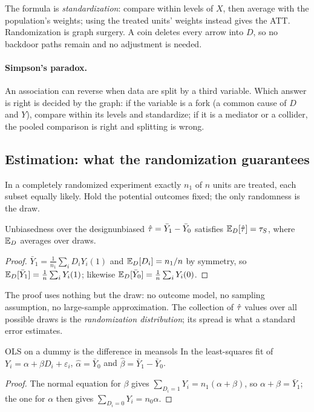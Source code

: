\documentclass[11pt]{article}
\begin{document}
The formula is \emph{standardization}: compare within levels of $X$, then average with the population's
weights; using the treated units' weights instead gives the ATT. Randomization is graph surgery. A coin
deletes every arrow into $D$, so no backdoor paths remain and no adjustment is needed.

\paragraph{Simpson's paradox.} An association can reverse when data are split by a third variable. Which
answer is right is decided by the graph: if the variable is a fork (a common cause of $D$ and $Y$), compare
within its levels and standardize; if it is a mediator or a collider, the pooled comparison is right and
splitting is wrong.

\subsection{Estimation: what the randomization guarantees}

In a completely randomized experiment exactly $n_1$ of $n$ units are treated, each subset equally likely.
Hold the potential outcomes fixed; the only randomness is the draw.

\begin{prop}{Unbiasedness over the design}{unbiased}
$\hat{\tau} = \bar Y_1 - \bar Y_0$ satisfies $\mathbb{E}_D[\hat{\tau}] = \tau_S$, where $\mathbb{E}_D$ averages over draws.
\end{prop}
\begin{proof}
$\bar Y_1 = \frac{1}{n_1}\sum_i D_i Y_i(1)$ and $\mathbb{E}_D[D_i] = n_1/n$ by symmetry, so
$\mathbb{E}_D[\bar Y_1] = \frac1n\sum_i Y_i(1)$; likewise $\mathbb{E}_D[\bar Y_0] = \frac1n\sum_i Y_i(0)$.
\end{proof}

The proof uses nothing but the draw: no outcome model, no sampling assumption, no large-sample
approximation. The collection of $\hat{\tau}$ values over all possible draws is the \emph{randomization
distribution}; its spread is what a standard error estimates.

\begin{prop}{OLS on a dummy is the difference in means}{ols}
In the least-squares fit of $Y_i = \alpha + \beta D_i + \varepsilon_i$, $\hat\alpha = \bar Y_0$ and
$\hat\beta = \bar Y_1 - \bar Y_0$.
\end{prop}
\begin{proof}
The normal equation for $\beta$ gives $\sum_{D_i=1} Y_i = n_1(\alpha + \beta)$, so $\alpha + \beta = \bar Y_1$;
the one for $\alpha$ then gives $\sum_{D_i=0} Y_i = n_0\alpha$.
\end{proof}
\end{document}
